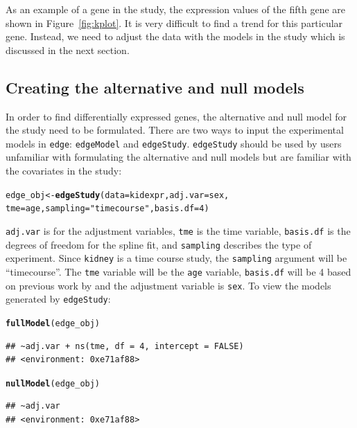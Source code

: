 \documentclass{article}\usepackage[]{graphicx}\usepackage[]{color}
\makeatletter
\newcommand{\hlnum}[1]{\textcolor[rgb]{0.686,0.059,0.569}{#1}}%
\newcommand{\hlstr}[1]{\textcolor[rgb]{0.192,0.494,0.8}{#1}}%
\newcommand{\hlstd}[1]{\textcolor[rgb]{0.345,0.345,0.345}{#1}}%
\newcommand{\hlkwb}[1]{\textcolor[rgb]{0.69,0.353,0.396}{#1}}%
\newcommand{\hlkwc}[1]{\textcolor[rgb]{0.333,0.667,0.333}{#1}}%
\newcommand{\hlkwd}[1]{\textcolor[rgb]{0.737,0.353,0.396}{\textbf{#1}}}%
\newenvironment{kframe}{%
 \def\at@end@of@kframe{}%
 \ifinner\ifhmode%
  \def\at@end@of@kframe{\end{minipage}}%
  \begin{minipage}{\columnwidth}%
 \fi\fi%
 \def\FrameCommand##1{\hskip\@totalleftmargin \hskip-\fboxsep
 \colorbox{shadecolor}{##1}\hskip-\fboxsep
     \hskip-\linewidth \hskip-\@totalleftmargin \hskip\columnwidth}%
 \MakeFramed {\advance\hsize-\width
   \@totalleftmargin\z@ \linewidth\hsize
   \@setminipage}}%
 {\par\unskip\endMakeFramed%
 \at@end@of@kframe}
\newenvironment{knitrout}{}{} %
\makeatother
\begin{document}
As an example of a gene in the study, the expression values of the fifth gene are shown in Figure~\ref{fig:kplot}. It is very difficult to find a trend for this particular gene. Instead, we need to adjust the data with the models in the study which is discussed in the next section.

\subsection{Creating the alternative and null models}
In order to find differentially expressed genes, the alternative and null model for the study need to be formulated. There are two ways to input the experimental models in {\tt edge}: {\tt edgeModel} and {\tt edgeStudy}. {\tt edgeStudy} should be used by users unfamiliar with formulating the alternative and null models but are familiar with the covariates in the study: 
\begin{knitrout}
\color{fgcolor}\begin{kframe}
\begin{alltt}
\hlstd{edge_obj} \hlkwb{<-} \hlkwd{edgeStudy}\hlstd{(}\hlkwc{data} \hlstd{= kidexpr,} \hlkwc{adj.var} \hlstd{= sex,}
    \hlkwc{tme} \hlstd{= age,} \hlkwc{sampling} \hlstd{=} \hlstr{"timecourse"}\hlstd{,} \hlkwc{basis.df} \hlstd{=} \hlnum{4}\hlstd{)}
\end{alltt}
\end{kframe}
\end{knitrout}

{\tt adj.var} is for the adjustment variables, {\tt tme} is the time variable, {\tt basis.df} is the degrees of freedom for the spline fit, and {\tt sampling} describes the type of experiment. Since {\tt kidney} is a time course study, the {\tt sampling} argument will be ``timecourse''. The {\tt tme} variable will be the {\tt age} variable, {\tt basis.df} will be 4 based on previous work by \cite{storey:2005} and the adjustment variable is {\tt sex}. To view the models generated by {\tt edgeStudy}:

\begin{knitrout}
\color{fgcolor}\begin{kframe}
\begin{alltt}
\hlkwd{fullModel}\hlstd{(edge_obj)}
\end{alltt}
\begin{verbatim}
## ~adj.var + ns(tme, df = 4, intercept = FALSE)
## <environment: 0xe71af88>
\end{verbatim}
\begin{alltt}
\hlkwd{nullModel}\hlstd{(edge_obj)}
\end{alltt}
\begin{verbatim}
## ~adj.var
## <environment: 0xe71af88>
\end{verbatim}
\end{kframe}
\end{knitrout}
\end{document}
